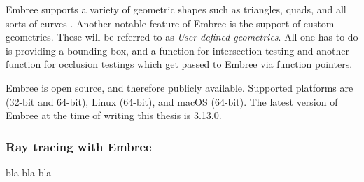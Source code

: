 Embree supports a variety of geometric shapes such as triangles, quads, and all sorts of curves .
Another notable feature of Embree is the support of custom geometries. These will be referred to as \emph{User defined geometries}. All one has to do is providing a bounding box, and a function for intersection testing and another function for occlusion testings which get passed to Embree via function pointers.

Embree is open source, and therefore publicly available. Supported platforms are (32-bit and 64-bit), Linux (64-bit), and macOS (64-bit). The latest version of Embree at the time of writing this thesis is 3.13.0. 

\subsubsection{Ray tracing with Embree}
bla bla bla
